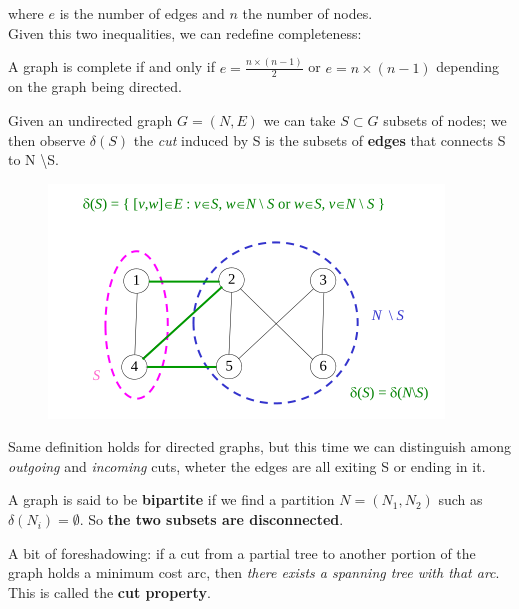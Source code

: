         where $e$ is the number of edges and $n$ the number of nodes.\\
        Given this two inequalities, we can redefine completeness: 
        \begin{definition}
            A graph is complete if and only if $e = \frac{n \times (n - 1)}{2}$ or $e = n \times (n - 1)$ depending on the graph being directed.
        \end{definition}
        \begin{definition}
            Given an undirected graph $G = (N, E)$ we can take $S \subset G$ subsets of nodes; we then observe $\delta(S)$ the \textit{cut} induced by S is the subsets of \textbf{edges} that connects S to N \textbackslash S.
        \end{definition}
        \begin{figure}[H]
            \centering
            \includegraphics[width = \textwidth]{./images/Cut.png}
        \end{figure}
        Same definition holds for directed graphs, but this time we can distinguish among \textit{outgoing} and \textit{incoming} cuts, wheter the edges are all exiting S or ending in it.
        \begin{definition}
            A graph is said to be \textbf{bipartite} if we find a partition $N = (N_1, N_2)$ such as $\delta(N_i) = \emptyset$. So \textbf{the two subsets are disconnected}.
        \end{definition}
        A bit of foreshadowing: if a cut from a partial tree to another portion of the graph holds a minimum cost arc, then \textit{there exists a spanning tree with that arc}. This is called the \textbf{cut property}.
            
